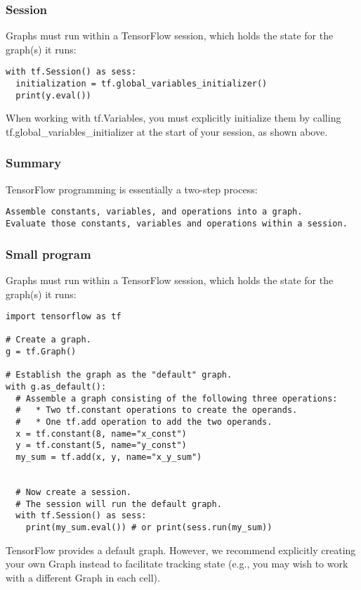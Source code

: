 \begin{frame}[fragile] \frametitle{Session}
Graphs must run within a TensorFlow session, which holds the state for the graph(s) it runs:
\begin{lstlisting}
with tf.Session() as sess:
  initialization = tf.global_variables_initializer()
  print(y.eval())
\end{lstlisting}
When working with tf.Variables, you must explicitly initialize them by calling tf.global\_variables\_initializer at the start of your session, as shown above.
\end{frame}

\begin{frame}[fragile] \frametitle{Summary}
TensorFlow programming is essentially a two-step process:
\begin{lstlisting}
Assemble constants, variables, and operations into a graph.
Evaluate those constants, variables and operations within a session.
\end{lstlisting}
\end{frame}


\begin{frame}[fragile] \frametitle{Small program}
Graphs must run within a TensorFlow session, which holds the state for the graph(s) it runs:
\begin{lstlisting}
import tensorflow as tf

# Create a graph.
g = tf.Graph()

# Establish the graph as the "default" graph.
with g.as_default():
  # Assemble a graph consisting of the following three operations:
  #   * Two tf.constant operations to create the operands.
  #   * One tf.add operation to add the two operands.
  x = tf.constant(8, name="x_const")
  y = tf.constant(5, name="y_const")
  my_sum = tf.add(x, y, name="x_y_sum")


  # Now create a session.
  # The session will run the default graph.
  with tf.Session() as sess:
    print(my_sum.eval()) # or print(sess.run(my_sum))
\end{lstlisting}
TensorFlow provides a default graph. However, we recommend explicitly creating your own Graph instead to facilitate tracking state (e.g., you may wish to work with a different Graph in each cell).
\end{frame}


